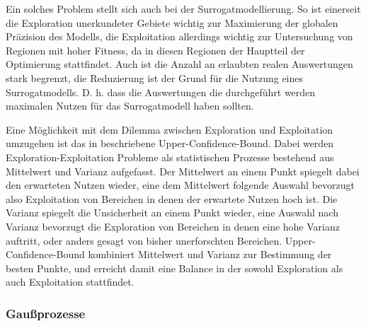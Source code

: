 Ein solches Problem stellt sich auch bei der Surrogatmodellierung.
So ist einerseit die Exploration unerkundeter Gebiete wichtig zur Maximierung der globalen Präzision des Modells, die Exploitation allerdings wichtig zur Untersuchung von Regionen mit hoher Fitness, da in diesen Regionen der Hauptteil der Optimierung stattfindet.
Auch ist die Anzahl an erlaubten realen Auswertungen stark begrenzt, die Reduzierung ist der Grund für die Nutzung eines Surrogatmodells.
D. h. dass die Auswertungen die durchgeführt werden maximalen Nutzen für das Surrogatmodell haben sollten.

Eine Möglichkeit mit dem Dilemma zwischen Exploration und Exploitation umzugehen ist das in \cite{Auer.2002} beschriebene Upper-Confidence-Bound. Dabei werden Exploration-Exploitation Probleme als statistischen Prozesse bestehend aus Mittelwert und Varianz aufgefasst.
Der Mittelwert an einem Punkt spiegelt dabei den erwarteten Nutzen wieder, eine dem Mittelwert folgende Auswahl bevorzugt also Exploitation von Bereichen in denen der erwartete Nutzen hoch ist.
Die Varianz spiegelt die Unsicherheit an einem Punkt wieder, eine Auswahl nach Varianz bevorzugt die Exploration von Bereichen in denen eine hohe Varianz auftritt, oder anders gesagt von bisher unerforschten Bereichen.
Upper-Confidence-Bound kombiniert Mittelwert und Varianz zur Bestimmung der besten Punkte, und erreicht damit eine Balance in der sowohl Exploration als auch Exploitation stattfindet.


\subsubsection{Gaußprozesse}

